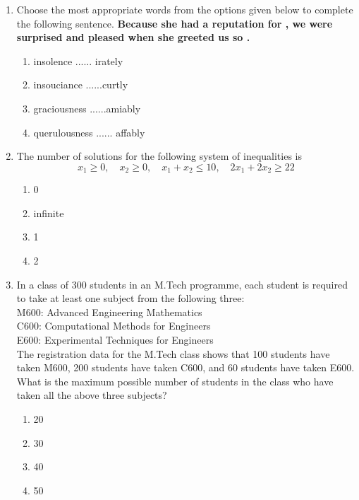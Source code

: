 \documentclass[journal,12pt,onecolumn]{IEEEtran}
\theoremstyle{remark}
\begin{document}
\begin{enumerate}[resume]
\item Choose the most appropriate words from the options given below to complete the following sentence.  
\textbf{Because she had a reputation for \underline{\hspace{1cm}}, we were surprised and pleased when she greeted us so \underline{\hspace{1cm}}. } 
\begin{enumerate}
\item insolence ...... irately  
\item insouciance ......curtly  
\item graciousness ......amiably  
\item querulousness ...... affably  
\end{enumerate}

\item The number of solutions for the following system of inequalities is  
\[
x_1 \geq 0,\quad x_2 \geq 0,\quad x_1 + x_2 \leq 10,\quad 2x_1 + 2x_2 \geq 22
\]  
\begin{multicols}{4}
\begin{enumerate}
\item 0  
\item infinite  
\item 1  
\item 2  
\end{enumerate}
\end{multicols}

\item In a class of 300 students in an M.Tech programme, each student is required to take at least one subject from the following three: \\ 
M600: Advanced Engineering Mathematics  \\
C600: Computational Methods for Engineers \\ 
E600: Experimental Techniques for Engineers \\ 
The registration data for the M.Tech class shows that 100 students have taken M600, 200 students have taken C600, and 60 students have taken E600. What is the maximum possible number of students in the class who have taken all the above three subjects? 
\begin{multicols}{4}
\begin{enumerate}
\item 20  
\item 30  
\item 40  
\item 50  
\end{enumerate}
\end{multicols}


\end{enumerate}
\end{document}
